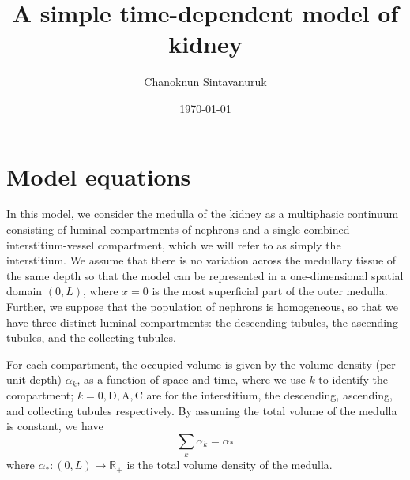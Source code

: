 \documentclass{article}
\title{A simple time-dependent model of kidney}
\author[1]{Chanoknun Sintavanuruk}
\date{\today}
\begin{document}
\sloppy %
\maketitle

\section{Model equations}

In this model, we consider the medulla of the kidney as a multiphasic continuum consisting of luminal compartments of nephrons and a single combined interstitium-vessel compartment, which we will refer to as simply the interstitium. 
We assume that there is no variation across the medullary tissue of the same depth so that the model can be represented in a one-dimensional spatial domain $(0,L)$, where $x=0$ is the most superficial part of the outer medulla.
Further, we suppose that the population of nephrons is homogeneous, so that we have three distinct luminal compartments: the descending tubules, the ascending tubules, and the collecting tubules.

For each compartment, the occupied volume is given by the volume density (per unit depth) $\alpha_k$, as a function of space and time, where we use $k$ to identify the compartment; $k=0,\mathrm{D},\mathrm{A},\mathrm{C}$ are for the interstitium, the descending, ascending, and collecting tubules respectively.
By assuming the total volume of the medulla is constant, we have
\begin{equation}\label{eq:vol_conserv}
    \sum_k \alpha_k = \alpha_*
\end{equation}
    where $\alpha_*:(0,L)\to \mathbb{R}_+$ is the total volume density of the medulla.
\end{document}
